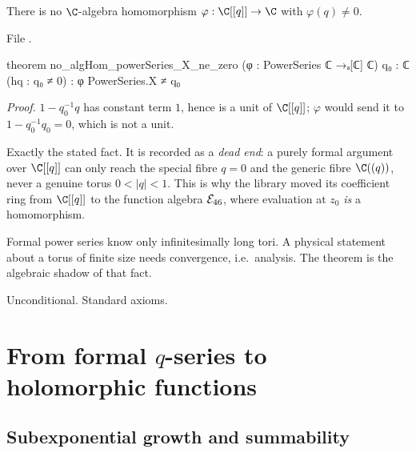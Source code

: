 \begin{theorem}\label{l14:thm:noalghom}
There is no $\C$-algebra homomorphism $\varphi:\C[[q]]\to\C$ with $\varphi(q)\neq0$.
\end{theorem}
\noindent File .
\begin{leancode}
theorem no_algHom_powerSeries_X_ne_zero (φ : PowerSeries ℂ →ₐ[ℂ] ℂ) {q₀ : ℂ} (hq : q₀ ≠ 0) :
    φ PowerSeries.X ≠ q₀
\end{leancode}
\noindent\emph{Proof.} $1 - q_0^{-1}q$ has constant term $1$, hence is a unit of $\C[[q]]$; $\varphi$ would send it to
$1 - q_0^{-1}q_0 = 0$, which is not a unit.
\begin{dictionary}
Exactly the stated fact. It is recorded as a \emph{dead end}: a purely formal argument over $\C[[q]]$ can only reach the
special fibre $q=0$ and the generic fibre $\C((q))$, never a genuine torus $0<|q|<1$. This is why the library moved its
coefficient ring from $\C[[q]]$ to the function algebra $\mathcal{E}_{46}$, where evaluation at $z_0$ \emph{is} a homomorphism.
\end{dictionary}
\begin{physics}
Formal power series know only infinitesimally long tori. A physical statement about a torus of finite size needs
convergence, i.e.\ analysis. The theorem is the algebraic shadow of that fact.
\end{physics}
\begin{status}
Unconditional. Standard axioms.
\end{status}

\section{From formal \texorpdfstring{$q$}{q}-series to holomorphic functions}\label{l14:sec:bridge}

\subsection{Subexponential growth and summability}

